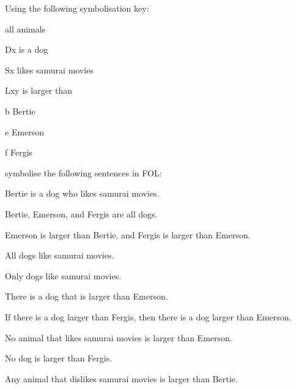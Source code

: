 \problempart 
Using the following symbolisation key:
\begin{ekey}
\item[\text{domain}] all animals
\item[Dx]  is a dog
\item[Sx]  likes samurai movies
\item[Lxy]  is larger than 
\item[b] Bertie
\item[e] Emerson
\item[f] Fergis
\end{ekey}
symbolise the following sentences in FOL:
\begin{earg}
\item Bertie is a dog who likes samurai movies.
\item[] 
\item Bertie, Emerson, and Fergis are all dogs.
\item[] 
\item Emerson is larger than Bertie, and Fergis is larger than Emerson.
\item[] 
\item All dogs like samurai movies.
\item[] 
\item Only dogs like samurai movies.
\item[] 
\item There is a dog that is larger than Emerson.
\item[] 
\item If there is a dog larger than Fergis, then there is a dog larger than Emerson.
\item[] 
\item No animal that likes samurai movies is larger than Emerson.
\item[] 
\item No dog is larger than Fergis.
\item[] 
\item Any animal that dislikes samurai movies is larger than Bertie.

\end{earg}
